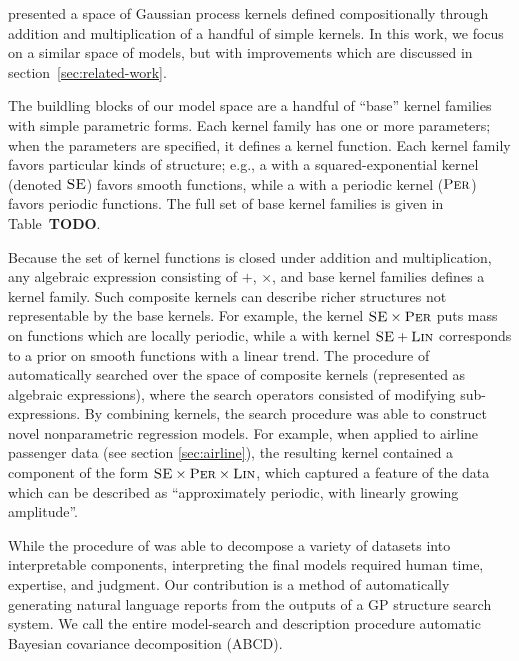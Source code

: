 \documentclass[letterpaper]{article}
\newcommand{\procedurename}{ABCD}
\begin{document}
\citet{DuvLloGroetal13} presented a space of Gaussian process kernels defined compositionally through addition and multiplication of a handful of simple kernels.
In this work, we focus on a similar space of models, but with improvements which are discussed in section~\ref{sec:related-work}. 

The buildling blocks of our model space are a handful of ``base'' kernel families with simple parametric forms. Each kernel family has one or more parameters; when the parameters are specified, it defines a kernel function. Each kernel family favors particular kinds of structure; e.g., a \gp{} with a squared-exponential kernel (denoted ${\textsc{SE}}$) favors smooth functions, while a \gp{} with a periodic kernel (${\textsc{Per}}$) favors periodic functions. The full set of base kernel families is given in Table~{\bf TODO}.

Because the set of kernel functions is closed under addition and multiplication, any algebraic expression consisting of $+$, $\times$, and base kernel families defines a kernel family. 
Such composite kernels can describe richer structures not representable by the base kernels.
For example, the kernel ${\textsc{SE}} \times {\textsc{Per}}$ puts mass on functions which are locally periodic, while a \gp{} with kernel ${\textsc{SE}} + {\textsc{Lin}}$ corresponds to a prior on smooth functions with a linear trend. The procedure of \citet{DuvLloGroetal13} automatically searched over the space of composite kernels (represented as algebraic expressions), where the search operators consisted of modifying sub-expressions. 
By combining kernels, the search procedure was able to construct novel nonparametric regression models.
For example, when applied to airline passenger data (see section \ref{sec:airline}), the resulting kernel contained a component of the form ${\textsc{SE}} \times {\textsc{Per}} \times {\textsc{Lin}}$, which captured a feature of the data which can be described as ``approximately periodic, with linearly growing amplitude''.

While the procedure of \citet{DuvLloGroetal13} was able to decompose a variety of datasets into interpretable components, interpreting the final models required human time, expertise, and judgment. Our contribution is a method of automatically generating natural language reports from the outputs of a GP structure search system.
%
We call the entire model-search and description procedure automatic Bayesian covariance decomposition (\procedurename{}).


\end{document}
